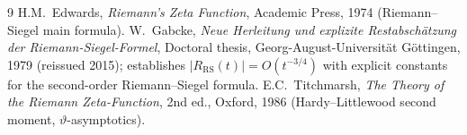\documentclass[11pt]{article}
\theoremstyle{definition}
\begin{document}
\begin{thebibliography}{9}
 H.M.\ Edwards, \emph{Riemann's Zeta Function}, Academic Press, 1974 (Riemann--Siegel main formula).
 W.\ Gabcke, \emph{Neue Herleitung und explizite Restabsch\"atzung der Riemann-Siegel-Formel}, Doctoral thesis, Georg-August-Universit\"at G\"ottingen, 1979 (reissued 2015); establishes $|R_{\mathrm{RS}}(t)| = O(t^{-3/4})$ with explicit constants for the second-order Riemann--Siegel formula.
 E.C.\ Titchmarsh, \emph{The Theory of the Riemann Zeta-Function}, 2nd ed., Oxford, 1986 (Hardy--Littlewood second moment, $\vartheta$-asymptotics).
\end{thebibliography}
\end{document}
